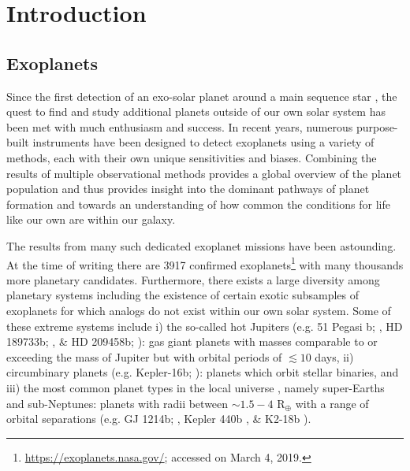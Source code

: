 \chapter{Introduction}

\section{Exoplanets}  \label{sect:exoplanets}
Since the first detection of an exo-solar planet around a main sequence star 
\citep{mayor95},
the quest to find and study additional planets outside of our own solar system 
has been met with much enthusiasm and success. In recent years, numerous 
purpose-built instruments
have been designed to detect exoplanets using a variety of methods, each with
their own unique sensitivities and biases. 
Combining the results of multiple observational methods provides a global overview
of the planet population and thus provides insight into
the dominant pathways of planet formation and towards an understanding of how
common the conditions for life like our own are within our galaxy.

The results from many such dedicated exoplanet missions have been 
astounding. At the time of writing there are 3917 confirmed 
exoplanets\footnote{\url{https://exoplanets.nasa.gov/}; accessed on March 4, 2019.} 
with many thousands more planetary candidates. Furthermore, there 
exists a large diversity among planetary systems including the existence 
of certain exotic subsamples of exoplanets for which analogs do not exist within 
our own solar system. Some of these extreme systems include i) the so-called hot 
Jupiters (e.g. 51 Pegasi b; \citealt{mayor95}, HD 189733b; \citealt{bouchy05}, 
\& HD 209458b; \citealt{mazeh99, charbonneau00}): 
gas giant planets with masses comparable to or exceeding the mass of Jupiter  
but with orbital periods of $\lesssim 10$ days, ii) circumbinary planets (e.g. 
Kepler-16b; \citealt{doyle11}): 
planets which orbit stellar binaries, and iii) the most common planet types
in the local universe \citep{petigura13}, namely super-Earths and sub-Neptunes:
planets with radii between $\sim 1.5-4$ R$_{\oplus}$ with a range of orbital separations
(e.g. GJ 1214b; \citealt{charbonneau09}, Kepler 440b \citealt{torres15}, \&
K2-18b \citealt{foremanmackey15,montet15}).


